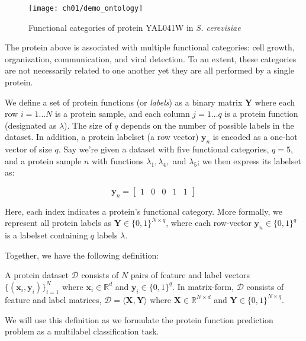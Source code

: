 \begin{figure}[!h]
  \centering
  \texttt{[image: ch01/demo\_ontology]}
  \caption{Functional categories of protein YAL041W in \textit{S. cerevisiae}}
  \label{demo:yeast_go}
\end{figure}

\noindent The protein above is associated with multiple functional
categories: cell growth, organization, communication, and viral detection. To
an extent, these categories are not necessarily related to one another yet
they are all performed by a single protein.

\par We define a set of protein functions (or \textit{labels}) as a binary
matrix $\mathbf{Y}$ where each row $i=1 \dots N$ is a protein sample, and
each column $j=1 \dots q$ is a protein function (designated as $\lambda$).
The size of $q$ depends on the number of possible labels in the dataset. In
addition, a protein labelset (a row vector) $\mathbf{y}_n$ is encoded as a
one-hot vector of size $q$. Say we're given a dataset with five functional
categories, $q=5$, and a protein sample $n$ with functions
$\lambda_1, \lambda_4,$ and $\lambda_5$; we then express its labelset as:

\[
    \mathbf{y}_n = \left[\begin{matrix}
        1 & 0 & 0 & 1 & 1
    \end{matrix} \right]
\]

\noindent Here, each index indicates a protein's functional category. More formally, we
represent all protein labels as $\mathbf{Y} \in \{0,1\}^{N \times q}$, where each
row-vector $\mathbf{y}_n \in \{0,1\}^q$ is a labelset containing $q$ labels
$\lambda$.


\newpage
Together, we have the following definition:

\begin{definition}{}
A protein dataset $\mathcal{D}$ consists of $N$ pairs of feature and label
vectors $\{(\mathbf{x}_i, \mathbf{y}_i)\}_{i=1}^{N}$ where $\mathbf{x}_i \in
\mathbb{R}^d$ and $\mathbf{y}_i \in \{0,1\}^q$. In matrix-form, $\mathcal{D}$
consists of feature and label matrices, $\mathcal{D} = \langle \mathbf{X},
\mathbf{Y} \rangle$ where $\mathbf{X} \in \mathbb{R}^{N \times d}$ and
$\mathbf{Y} \in \{0,1\}^{N \times q}$.
\end{definition}

\par We will use this definition as we formulate the protein function
prediction problem as a multilabel classification task.


